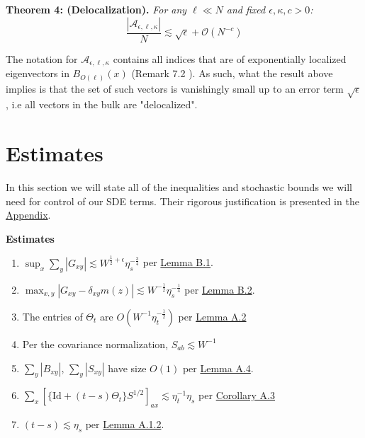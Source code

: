 \documentclass[11pt]{article}
\newenvironment{boxtheorem}[1]
  {\begin{mdframed}\noindent\textbf{#1}\itshape\space}
  {\end{mdframed}}
\newenvironment{boxt}[1]
  {\begin{mdframed}\noindent\textbf{#1}\normalfont\space}
  {\end{mdframed}}
\begin{document}
\begin{boxtheorem}{Theorem 4: (Delocalization).}
For any $\ell\ll N$ and fixed $\epsilon, \kappa, c>0$: $$\frac{|\mathcal{A}_{\epsilon, \ell, \kappa}|}{N}\lesssim \sqrt{\epsilon}+\mathcal{O}(N^{-c})$$
\end{boxtheorem}
The notation for $\mathcal{A}_{\epsilon, \ell, \kappa}$ contains all indices that are of exponentially localized eigenvectors in $B_{O(\ell)}(x)$ (Remark 7.2 \cite{21}). As such, what the result above implies is that the set of such vectors is vanishingly small up to an error term $\sqrt \epsilon$, i.e all vectors in the bulk are "delocalized". 



\newpage
\section{Estimates }
\label{sec:estimates}

In this section we will state all of the inequalities and stochastic bounds we will need for control of our SDE terms. Their rigorous justification is presented in the \hyperref[sec:appendix]{Appendix}.

\begin{boxt}{Estimates}

\begin{enumerate}

\item  $\sup_x\sum_{y}|G_{xy}|\lesssim W^{\frac{1}{2}+\epsilon}\eta_{s}^{-\frac{3}{4}}$ per \hyperref[lemma-b1]{Lemma B.1}.

\item $\max_{x,y}\left\vert G_{xy} - \delta_{xy}m(z)\right\vert\lesssim W^{-\frac{1}{2}}\eta_s^{-\frac{1}{4}}$ per  \hyperref[lemma-b2]{Lemma B.2}. 


\item  The entries of $\Theta_{t}$ are  $O\left(W^{-1}\eta_{t}^{-\frac{1}{2}}\right)$ per \hyperref[lemma-a2]{Lemma A.2}
    
\item Per the covariance normalization, $S_{ab}\lesssim W^{-1}$
\item $\sum_{y}|B_{xy}|$, $\sum_{y}|S_{xy}|$ have size $O(1)$ per \hyperref[lemma-a4]{Lemma A.4}.

\item $\sum_{x}\left[\{\text{Id} + (t-s)\Theta_t\}S^{1/2}\right]_{ax}\lesssim \eta_t^{-1}\eta_s$ per \hyperref[cor-a3]{Corollary A.3}

\item $(t-s)\lesssim \eta_s$ per \hyperref[lemma-a12]{Lemma A.1.2}. 
\end{enumerate}
\end{boxt}
\end{document}

